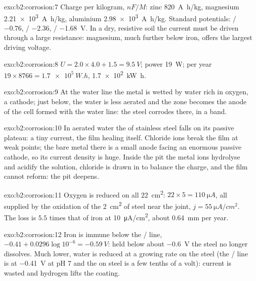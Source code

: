 \begin{solution}{exo:b2:corrosion:7}
Charge per kilogram, $nF/M$: zinc \qty{820}{A.h/kg}, magnesium \qty{2.21e3}{A.h/kg},
aluminium \qty{2.98e3}{A.h/kg}. Standard potentials: / $-0.76$,
/ $-2.36$, / \qty{-1.68}{V}. In a dry, resistive soil
the current must be driven through a large resistance: magnesium, much further
below iron, offers the largest driving voltage.
\end{solution}

\begin{solution}{exo:b2:corrosion:8}
$U = 2.0 \times 4.0 + 1.5 = \qty{9.5}{V}$; power \qty{19}{W}; per year $19 \times
8766 = \qty{1.7e5}{W.h}$, \qty{1.7e2}{kW.h}.
\end{solution}

\begin{solution}{exo:b2:corrosion:9}
At the water line the metal is wetted by water rich in oxygen, a cathode; just
below, the water is less aerated and the zone becomes the anode of the cell
formed with the water line: the steel corrodes there, in a band.
\end{solution}

\begin{solution}{exo:b2:corrosion:10}
In aerated water the  of stainless steel falls on its
passive plateau: a tiny current, the film healing itself. Chloride ions break
the film at weak points; the bare metal there is a small anode facing an
enormous passive cathode, so its current density is huge. Inside the pit the
metal ions hydrolyse and acidify the solution, chloride is drawn in to balance
the charge, and the film cannot reform: the pit deepens.
\end{solution}

\begin{solution}{exo:b2:corrosion:11}
Oxygen is reduced on all \qty{22}{cm^2}:  $22 \times 5 =
\qty{110}{\micro A}$, all supplied by the oxidation of the \qty{2}{cm^2} of steel
near the joint, $j = \qty{55}{\micro A/cm^2}$. The loss is $5.5$ times that of iron
at \qty{10}{\micro A/cm^2}, about \qty{0.64}{mm} per year.
\end{solution}

\begin{solution}{exo:b2:corrosion:12}
Iron is immune below the / line, $-0.41 + 0.0296\log 10^{-6} =
\qty{-0.59}{V}$: held below about \qty{-0.6}{V} the steel no longer dissolves. Much
lower, water is reduced at a growing rate on the steel (the / line is at
\qty{-0.41}{V} at pH 7 and the  on steel is a few tenths of a volt):
current is wasted and hydrogen lifts the coating.
\end{solution}

